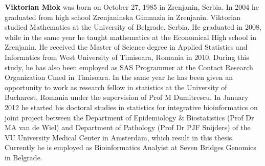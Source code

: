 
\begin{biography}

{\bf Viktorian Miok} was born on October 27, 1985 in Zrenjanin, Serbia. In 2004 he graduated from high school Zrenjaninska Gimnazia in Zrenjanin. Viktorian studied Mathematics at the University of Belgrade, Serbia. He graduated in 2008, while in the same year he taught mathematics at the Economical High school in Zrenjanin. He received the Master of Science degree in Applied Statistics and Informatics from West University of Timisoara, Romania in 2010. During this study, he has also been employed as SAS Programmer at the Contact Research Organization Cmed in Timisoara. In the same year he has been given an opportunity to work as research fellow in statistics at the University of Bucharest, Romania under the supervision of Prof M Dumitrescu. In January 2012 he started his doctoral studies in statistics for integrative bioinformatics on joint project between the Department of Epidemiology $\&$ Biostatistics (Prof Dr MA van de Wiel) and Department of Pathology (Prof Dr PJF Snijders) of the VU University Medical Center in Amsterdam, which result in this thesis. Currently he is employed as Bioinformatics Analyist at Seven Bridges Genomics in Belgrade. 
\end{biography}







